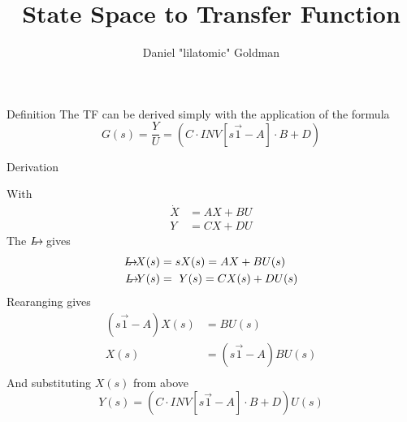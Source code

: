 \documentclass{../templates/topic}
\title{State Space to Transfer Function}
\author{Daniel "lilatomic" Goldman}
\begin{document}
\maketitle

\begin{section}{Definition}
	The TF can be derived simply with the application of the formula
	\begin{equation}
		G(s)=\frac{Y}{U}=(C\cdot INV[s\vec{1}-A]\cdot B+D)
	\end{equation}
\end{section}

\begin{section}{Derivation}
	
	With
	\begin{align}
		\dot{X}&=AX+BU\\
		Y&=CX+DU
	\end{align}
	The $\laplace$ gives
	\begin{align}
		\laplace{X}(s)&=sX(s)=AX+BU(s)\\
		\laplace{Y}(s)&=\ Y(s)=CX(s)+DU(s)
	\end{align}
	Rearanging gives
	\begin{align}
		(s\vec{1}-A)X(s)&=BU(s)\\
		X(s)&=(s\vec{1}-A)BU(s)\\
	\end{align}
	And substituting $X(s)$ from above
	\begin{equation}
		Y(s)=(C\cdot INV[s\vec{1}-A]\cdot B+D)U(s)
	\end{equation}
\end{section}
\end{document}

